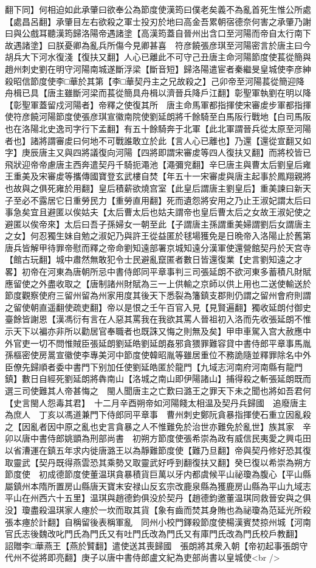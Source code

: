 翻下同】何相迫如此承肇曰欲奉公為節度使漢筠曰僕老矣義不為亂首死生惟公所處【處昌呂翻】承肇目左右欲殺之軍士投刃於地曰高金吾累朝宿德奈何害之承肇乃謝曰與公戲耳聽漢筠歸洛陽帝遇諸塗【高漢筠蓋自晉州出含口至河陽而帝自太行南下故遇諸塗】曰朕憂卿為亂兵所傷今見卿甚喜　符彦饒張彦琪至河陽密言於唐主曰今胡兵大下河水復淺【復扶又翻】人心已離此不可守己丑唐主命河陽節度使萇從簡與趙州刺史劉在明守河陽南城遂斷浮梁【斷音短】歸洛陽遣宦者秦繼旻皇城使李彦紳殺昭信節度使李□華於其第【李□華契丹主之兄故殺之】己卯帝至河陽萇從簡迎降舟楫已具【唐主雖斷河梁而萇從簡具舟楫以濟晉兵降戶江翻】彰聖軍執劉在明以降【彰聖軍蓋留戍河陽者】帝釋之使復其所　唐主命馬軍都指揮使宋審䖍步軍都指揮使符彦饒河陽節度使張彦琪宣徽南院使劉延朗將千餘騎至白馬阪行戰地【白司馬阪也在洛陽北史逸司字行下孟翻】有五十餘騎奔于北軍【此北軍謂晉兵從太原至河陽者也】諸將謂審䖍曰何地不可戰誰敢立於此【言人心已離也】乃還【還從宣翻又如字】庚辰唐主又與四將議復向河陽【四將即謂宋審䖍等四人復扶又翻】而將校皆已飛狀迎帝帝慮唐主西奔遣契丹千騎扼澠池【澠彌兖翻】辛巳唐主與曹太后劉皇后雍王重美及宋審䖍等攜傳國寶登玄武樓自焚【年五十一宋審䖍與唐主起事於鳳翔親將也故與之俱死雍於用翻】皇后積薪欲燒宫室【此皇后謂唐主劉皇后】重美諫曰新天子至必不露居它日重勞民力【重勞直用翻】死而遺怨將安用之乃止王淑妃謂太后曰事急矣宜且避匿以俟姑夫【太后曹太后也姑夫謂帝也皇后曹太后之女故王淑妃使之避匿以俟帝來】太后曰吾子孫婦女一朝至此【子謂唐主孫謂重美婦謂劉后女謂唐主之女】何忍獨生妹自勉之淑妃乃與許王從益匿於毬場獲免是日晩帝入洛陽止於舊第唐兵皆解甲待罪帝慰而釋之帝命劉知遠部署京城知遠分漢軍使還營館契丹於天宫寺【館古玩翻】城中肅然無敢犯令士民避亂竄匿者數日皆還復業【史言劉知遠之才畧】初帝在河東為唐朝所忌中書侍郎同平章事判三司張延朗不欲河東多蓄積凡財賦應留使之外盡收取之【唐制諸州財賦為三一上供輸之京師以供上用也二送使輸送於節度觀察使府三留州留為州家用度其後天下悉裂為籓鎮支郡則仍謂之留州會府則謂之留使朝直遥翻使疏吏翻】帝以是恨之壬午百官入見【見賢遍翻】獨收延朗付御史臺餘皆謝恩【漢馮衍有言在人惡其罵我在我欲其罵人晉祖初入洛而先收張延朗不惟示天下以褊亦非所以勸居官奉職者也既誅又悔之則無及矣】甲申車駕入宫大赦應中外官吏一切不問惟賊臣張延朗劉延皓劉延朗姦邪貪猥罪難容貸中書侍郎平章事馬胤孫樞密使房暠宣徽使李專美河中節度使韓昭胤等雖居重位不務詭隨並釋罪除名中外臣僚先歸順者委中書門下别加任使劉延皓匿於龍門【九域志河南府河南縣有龍門鎮】數日自經死劉延朗將犇南山【洛城之南山即伊陽諸山】捕得殺之斬張延朗既而選三司使難其人帝甚悔之　閩人聞唐主之亡歎曰潞王之罪天下未之聞也將如吾君何【史言閩人怨毒其君】　十二月辛酉朔帝如河陽餞太相温及契丹兵歸國　追廢唐主為庶人　丁亥以馮道兼門下侍郎同平章事　曹州刺史鄭阮貪暴指揮使石重立因亂殺之【因亂者因中原之亂也史言貪暴之人不惟難免於治世亦難免於亂世】族其家　辛卯以唐中書侍郎姚顗為刑部尚書　初朔方節度使張希崇為政有威信民夷愛之興屯田以省漕運在鎮五年求内徙唐潞王以為靜難節度使【難乃旦翻】帝與契丹修好恐其復取靈武【契丹既得燕雲恐其乘勢又取靈武好呼到翻復扶又翻】癸巳復以希崇為朔方節度使　初成德節度使董温琪貪暴積貨巨萬以牙内都虞候平山祕瓊為腹心【平山縣屬鎮州本隋所置房山縣唐天寶末安禄山反玄宗改鹿泉縣為獲鹿房山縣為平山九域志平山在州西六十五里】温琪與趙德鈞俱没於契丹【趙德鈞邀董温琪同救晉安與之俱没】瓊盡殺温琪家人瘞於一坎而取其貨【象有齒而焚其身賄也為祕瓊為范延光所殺張本瘞於計翻】自稱留後表稱軍亂　同州小校門鐸殺節度使楊漢賓焚掠州城【河南官氏志後魏改叱門氏為門氏又有吐門氏改為門氏又有庫門氏改為門氏校戶教翻】　詔贈李□華燕王【燕於贒翻】遣使送其喪歸國　張朗將其衆入朝【帝初起事張朗守代州不從將即亮翻】庚子以唐中書侍郎盧文紀為吏部尚書以皇城使<br />
